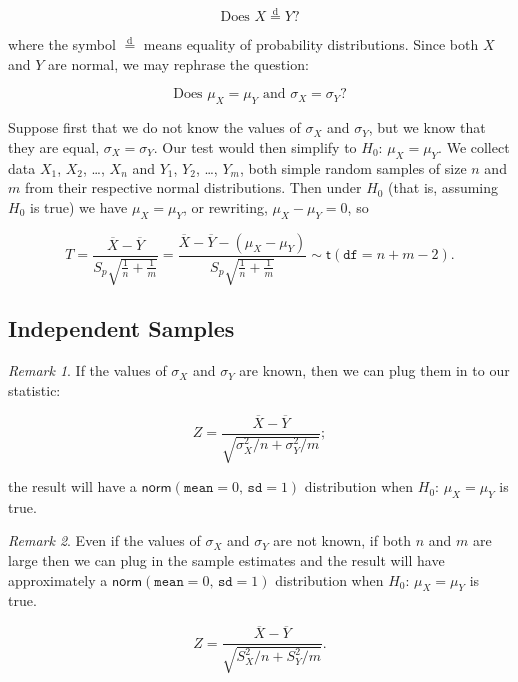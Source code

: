 \documentclass[]{book}
\numberwithin{equation}{chapter}
\numberwithin{figure}{chapter}
\theoremstyle{plain}
\theoremstyle{definition}
\theoremstyle{remark}
\theoremstyle{definition}
\theoremstyle{definition}
\theoremstyle{remark}
\newtheorem*{remark}{Remark}
\begin{document}
\begin{equation}
\mbox{Does }X\overset{\mathrm{d}}{=}Y?
\end{equation}

where the symbol \(\overset{\mathrm{d}}{=}\) means equality of
probability distributions. Since both \(X\) and \(Y\) are normal, we may
rephrase the question:

\begin{equation}
\mbox{Does }\mu_{X} = \mu_{Y}\mbox{ and }\sigma_{X} = \sigma_{Y}?
\end{equation}

Suppose first that we do not know the values of \(\sigma_{X}\) and
\(\sigma_{Y}\), but we know that they are equal,
\(\sigma_{X}=\sigma_{Y}\). Our test would then simplify to
\(H_{0}:\,\mu_{X} = \mu_{Y}\). We collect data \(X_{1}\), \(X_{2}\),
\ldots{}, \(X_{n}\) and \(Y_{1}\), \(Y_{2}\), \ldots{}, \(Y_{m}\), both
simple random samples of size \(n\) and \(m\) from their respective
normal distributions. Then under \(H_{0}\) (that is, assuming \(H_{0}\)
is true) we have \(\mu_{X} = \mu_{Y}\), or rewriting,
\(\mu_{X} - \mu_{Y} = 0\), so

\begin{equation}
T = \frac{\overline{X} - \overline{Y}}{S_{p}\sqrt{\frac{1}{n} + \frac{1}{m}}} = \frac{\overline{X} - \overline{Y} - (\mu_{X} - \mu_{Y})}{S_{p}\sqrt{\frac{1}{n} + \frac{1}{m}}}\sim\mathsf{t}(\mathtt{df} = n + m - 2).
\end{equation}

\subsection{Independent Samples}\label{independent-samples}

\begin{remark}
If the values of \(\sigma_{X}\) and \(\sigma_{Y}\) are known, then we
can plug them in to our statistic:

\begin{equation} 
Z = \frac{\overline{X} - \overline{Y}}{\sqrt{\sigma_{X}^{2}/n + \sigma_{Y}^{2}/m}};
\end{equation}

the result will have a
\(\mathsf{norm}(\mathtt{mean} = 0,\,\mathtt{sd} = 1)\) distribution when
\(H_{0}:\,\mu_{X} = \mu_{Y}\) is true.
\end{remark}

\bigskip

\begin{remark}
Even if the values of \(\sigma_{X}\) and \(\sigma_{Y}\) are not known,
if both \(n\) and \(m\) are large then we can plug in the sample
estimates and the result will have approximately a
\(\mathsf{norm}(\mathtt{mean} = 0,\,\mathtt{sd} = 1)\) distribution when
\(H_{0}:\,\mu_{X} = \mu_{Y}\) is true.

\begin{equation} 
Z = \frac{\overline{X} - \overline{Y}}{\sqrt{S_{X}^{2}/n + S_{Y}^{2}/m}}.
\end{equation}
\end{remark}
\end{document}
